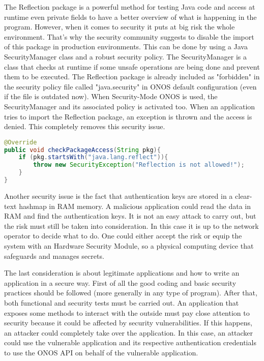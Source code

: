 The Reflection package is a powerful method for testing Java code and access at runtime even private fields to have a better overview of what is happening in the program. However, when it comes to security it puts at big risk the whole environment. That's why the security community suggests to disable the import of this package in production environments. This can be done by using a Java SecurityManager class and a robust security policy. The SecurityManager is a class that checks at runtime if some unsafe operations are being done and prevent them to be executed. The Reflection package is already included as "forbidden" in the security policy file called "java.security" in ONOS default configuration (even if the file is outdated now). When Security-Mode ONOS is used, the SecurityManager and its associated policy is activated too. When an application tries to import the Reflection package, an exception is thrown and the access is denied. This completely removes this security issue.
\begin{lstlisting}[language=Java]
@Override
public void checkPackageAccess(String pkg){
    if (pkg.startsWith("java.lang.reflect")){
        throw new SecurityException("Reflection is not allowed!");
    }
}
\end{lstlisting}

Another security issue is the fact that authentication keys are stored in a clear-text hashmap in RAM memory. A malicious application could read the data in RAM and find the authentication keys. It is not an easy attack to carry out, but the risk must still be taken into consideration. In this case it is up to the network operator to decide what to do. One could either accept the risk or equip the system with an Hardware Security Module, so a physical computing device that safeguards and manages secrets.
\medskip

The last consideration is about legitimate applications and how to write an application in a secure way. First of all the good coding and basic security practices should be followed (more generally in any type of program). After that, both functional and security tests must be carried out. An application that exposes some methods to interact with the outside must pay close attention to security because it could be affected by security vulnerabilities. If this happens, an attacker could completely take over the application. In this case, an attacker could use the vulnerable application and its respective authentication credentials to use the ONOS API on behalf of the vulnerable application.

